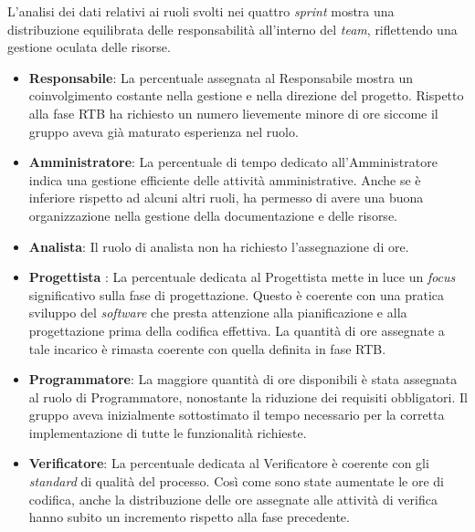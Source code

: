L'analisi dei dati relativi ai ruoli svolti nei quattro \textit{sprint} mostra una distribuzione equilibrata delle responsabilità all'interno del \textit{team}, riflettendo una gestione oculata delle risorse.
\begin{itemize}
	\item \textbf{Responsabile}: La percentuale assegnata al Responsabile mostra un coinvolgimento costante nella gestione e nella direzione del progetto. Rispetto alla fase RTB ha richiesto un numero lievemente minore di ore siccome il gruppo aveva già maturato esperienza nel ruolo.
	\item \textbf{Amministratore}: La percentuale di tempo dedicato all'Amministratore indica una gestione efficiente delle attività amministrative. Anche se è inferiore rispetto ad alcuni altri ruoli, ha permesso di avere una buona organizzazione nella gestione della documentazione e delle risorse.
	\item \textbf{Analista}: Il ruolo di analista non ha richiesto l'assegnazione di ore.
	\item \textbf{Progettista} : La percentuale dedicata al Progettista mette in luce un \textit{focus} significativo sulla fase di progettazione. Questo è coerente con una pratica sviluppo del \textit{software} che presta attenzione alla pianificazione e alla progettazione prima della codifica effettiva. La quantità di ore assegnate a tale incarico è rimasta coerente con quella definita in fase RTB.
	\item \textbf{Programmatore}: La maggiore quantità di ore disponibili è stata assegnata al ruolo di Programmatore, nonostante la riduzione dei requisiti obbligatori. Il gruppo aveva inizialmente sottostimato il tempo necessario per la corretta implementazione di tutte le funzionalità richieste.
	\item \textbf{Verificatore}: La percentuale dedicata al Verificatore è coerente con gli \textit{standard} di qualità del processo. Così come sono state aumentate le ore di codifica, anche la distribuzione delle ore assegnate alle attività di verifica hanno subito un incremento rispetto alla fase precedente.
\end{itemize}

\newpage

